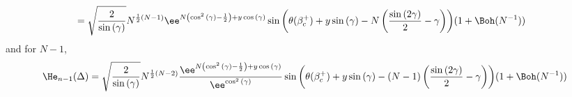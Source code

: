 {\begin{equation}
\begin{split}
		& = \sqrt{\frac{2}{\sin{(\gamma)}}} N^{\frac{1}{2}\left(N - 1\right)}
		\ee^{N\left(\cos^2{(\gamma)} - \frac{1}{2} \right)  + y\cos{(\gamma)}} \sin{\left(\theta(\beta_c^+) + y \sin{(\gamma)}-N\left(\frac{\sin{(2\gamma)}}{2}-\gamma\right)\right)} 
		(1 + \Boh(N^{-1}))
	\end{split}
\end{equation}
and for $N-1$,
\begin{equation}
	\He_{n-1}(\Delta) = \sqrt{\frac{2}{\sin{(\gamma)}}} N^{\frac{1}{2}(N - 2)} \frac{\ee^{N\left(\cos^2{(\gamma)} - \frac{1}{2} \right) + y\cos{(\gamma)}}}{\ee^{\cos^2{(\gamma)}}} \sin{\left(\theta(\beta_c^+) + y \sin{(\gamma)} - (N-1) \left(\frac{\sin{(2\gamma)}}{2}-\gamma\right)\right)} 
	(1 + \Boh(N^{-1}))
\end{equation}

}
